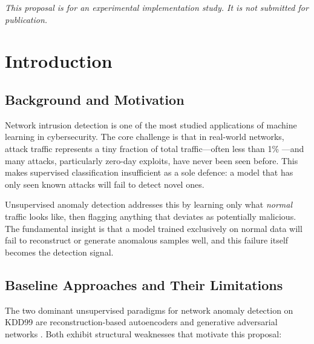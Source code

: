 \documentclass[12pt,a4paper]{article}
\begin{document}
\begin{titlepage}
\vfill
{\small \textit{This proposal is for an experimental implementation study.
It is not submitted for publication.}}
\end{titlepage}

\tableofcontents
\newpage

\section{Introduction}

\subsection{Background and Motivation}

Network intrusion detection is one of the most studied applications of machine
learning in cybersecurity. The core challenge is that in real-world networks,
attack traffic represents a tiny fraction of total traffic---often less than 1\%
---and many attacks, particularly zero-day exploits, have never been seen before.
This makes supervised classification insufficient as a sole defence: a model
that has only seen known attacks will fail to detect novel ones.

Unsupervised anomaly detection addresses this by learning only what \emph{normal}
traffic looks like, then flagging anything that deviates as potentially malicious.
The fundamental insight is that a model trained exclusively on normal data will
fail to reconstruct or generate anomalous samples well, and this failure itself
becomes the detection signal.

\subsection{Baseline Approaches and Their Limitations}

The two dominant unsupervised paradigms for network anomaly detection on KDD99
are reconstruction-based autoencoders \citep{ae_analysis_nids} and generative
adversarial networks \citep{alad}. Both exhibit structural weaknesses that
motivate this proposal:
\end{document}
